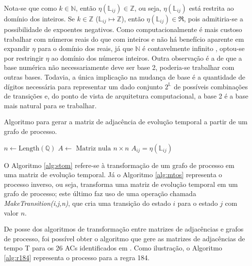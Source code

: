 \documentclass[a4,11pt]{article}
\begin{document}
Nota-se que como $k \in \mathbb{N}$, então $\eta(\mathbb{L}_{ij}) \in \mathbb{Z}$,
ou seja, $\eta(\mathbb{L}_{ij})$ está restrita ao domínio dos inteiros. Se
$k \in \mathbb{Z}$ ($\mathbb{L}_{ij} \mapsto \mathbb{Z}$), então
$\eta(\mathbb{L}_{ij}) \in \Re$, pois admitiria-se a possibilidade de expoentes negativos.
Como computacionalmente é mais custoso trabalhar com números reais do que com inteiros
e não há benefício aparente em expandir $\eta$ para o domínio dos reais,
já que $\mathbb{N}$ é contavelmente infinito \cite{lewis2008}, optou-se
por restringir $\eta$ ao domínio dos números inteiros. Outra observação
é a de que a base numérica não necessariamente deve ser base 2, poderia-se trabalhar com outras
bases. Todavia, a única implicação na mudança de base é a quantidade de dígitos
necessária para representar um dado conjunto $2^{\mathbb{L}}$ de possíveis combinações de
transições e, do ponto de vista de arquitetura computacional, a base 2 é a
base mais natural para se trabalhar.

\begin{algorithm}
\caption{Algoritmo para gerar a matriz de adjacência de evolução temporal a partir
de um grafo de processo.}
\label{alg:stom}
\begin{algorithmic}
\STATE $n \leftarrow \mbox{Length}(\mathbb{Q})$ 
\STATE $A \leftarrow \mbox{ Matriz nula } n \times n$
\STATE $A_{ij} = \eta(\mathbb{\mathbb{L}}_{ij})$
\ENDIF
\ENDFOR
\end{algorithmic}
\end{algorithm}

O Algoritmo \ref{alg:stom} refere-se à transformação de um grafo
de processo em uma matriz de evolução temporal. Já o Algoritmo \ref{alg:mtos}
representa o processo inverso, ou seja, transforma uma
matriz de evolução temporal em um grafo de processo; este último
faz uso de uma operação chamada \emph{MakeTransition(i,j,n)}, que cria uma transição
do estado $i$ para o estado $j$ com valor $n$.

De posse dos algoritmos de transformação entre matrizes de adjacências e grafos
de processo, foi possível obter o algoritmo que gere as matrizes de adjacências de tempo
T para os 26 ACs identificados em \cite{trafaniuc2004}. Como
ilustração, o Algoritmo \ref{alg:r184} representa o processo para a regra 184.
\end{document}
